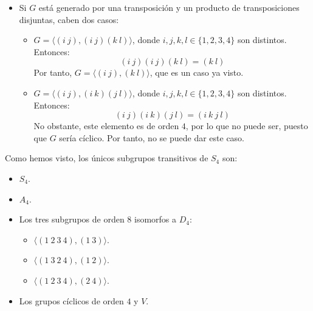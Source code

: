 \begin{ejercicio}
\begin{enumerate}
\begin{itemize}
\begin{itemize}
\begin{itemize}
                    \item Si $G$ está generado por una transposición y un producto de transposiciones disjuntas, caben dos casos:
                    \begin{itemize}
                        \item $G=\langle (i\ j), (i\ j)(k\ l) \rangle$, donde $i,j,k,l\in \{1, 2, 3, 4\}$ son distintos. Entonces:
                        \begin{equation*}
                            (i\ j)(i\ j)(k\ l) = (k\ l)
                        \end{equation*}
                        Por tanto, $G=\langle (i\ j), (k\ l) \rangle$, que es un caso ya visto.
                        \item $G=\langle (i\ j), (i\ k)(j\ l) \rangle$, donde $i,j,k,l\in \{1, 2, 3, 4\}$ son distintos. Entonces:
                        \begin{equation*}
                            (i\ j)(i\ k)(j\ l) = (i\ k\ j\ l)
                        \end{equation*}
                        No obstante, este elemento es de orden $4$, por lo que no puede ser, puesto que $G$ sería cíclico. Por tanto, no se puede dar este caso.
                    \end{itemize}
                \end{itemize}
            \end{itemize}
        \end{itemize}
        Como hemos visto, los únicos subgrupos transitivos de $S_4$ son:
        \begin{itemize}
            \item $S_4$.
            \item $A_4$.
            \item Los tres subgrupos de orden $8$ isomorfos a $D_4$:
            \begin{itemize}
                \item $\langle (1\ 2\ 3\ 4), (1\ 3)\rangle$.
                \item $\langle (1\ 3\ 2\ 4), (1\ 2)\rangle$.
                \item $\langle (1\ 2\ 3\ 4), (2\ 4)\rangle$.
            \end{itemize}
            \item Los grupos cíclicos de orden $4$ y $V$.
        \end{itemize}
    \end{enumerate}
\end{ejercicio}


